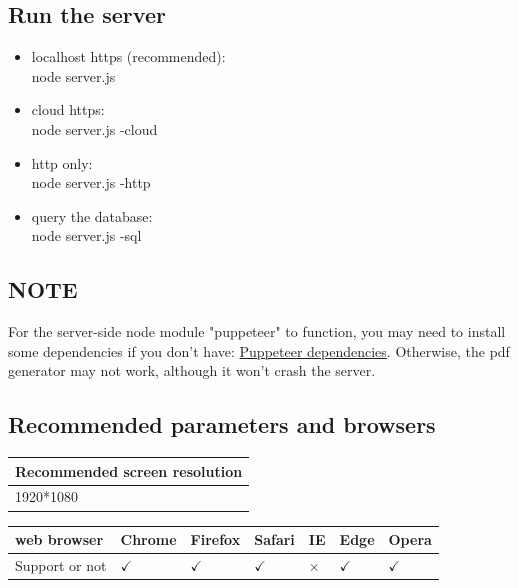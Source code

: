 \documentclass[11pt]{article}
\begin{document}
\begin{spacing}{1.0}
	\subsection{Run the server}
	\begin{itemize}
  		\item localhost https (recommended):\\
  		\hspace*{1cm} node server.js
  		\item cloud https:\\
  		\hspace*{1cm} node server.js -cloud
  		\item http only:\\
  		\hspace*{1cm} node server.js -http
  		\item query the database:\\
  		\hspace*{1cm} node server.js -sql
	\end{itemize}

	\subsection{NOTE}
	For the server-side node module "puppeteer" to function, you may need to install some dependencies if you don't have:
	\href{https://github.com/puppeteer/puppeteer/blob/master/docs/troubleshooting.md#chrome-headless-doesnt-launch-on-unix%20dependencies}{Puppeteer dependencies}.
	Otherwise, the pdf generator may not work, although it won't crash the server.
		\subsection{Recommended parameters and browsers}
		\begin{table}[H]
			\begin{tabular}{|l|}
				\hline
				Recommended screen resolution \\ \hline
				1920*1080                     \\ \hline
			\end{tabular}
		\end{table}
	\begin{table}[H]
		\begin{tabular}{|l|l|l|l|l|l|l|}
			\hline
			web browser    & Chrome & Firefox & Safari & IE & Edge & Opera \\ \hline
			Support or not &  $ \checkmark$     &    $ \checkmark$     &  $ \checkmark$       &   $\times$  &  $ \checkmark$     &   $ \checkmark$     \\ \hline
		\end{tabular}
	\end{table}
		

\end{spacing}
\end{document}
